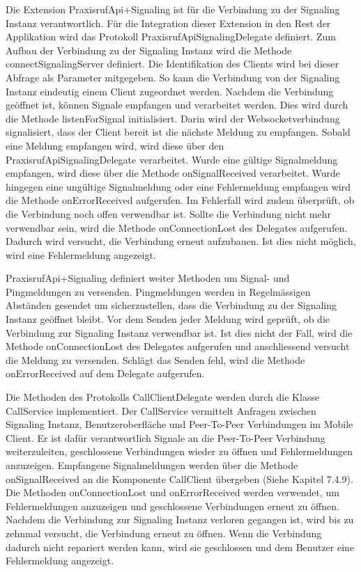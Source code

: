 Die Extension PraxisrufApi+Signaling ist für die Verbindung zu der Signaling Instanz verantwortlich.
Für die Integration dieser Extension in den Rest der Applikation wird das Protokoll PraxisrufApiSignalingDelegate definiert.
Zum Aufbau der Verbindung zu der Signaling Instanz wird die Methode connectSignalingServer definiert.
Die Identifikation des Clients wird bei dieser Abfrage als Parameter mitgegeben.
So kann die Verbindung von der Signaling Instanz eindeutig einem Client zugeordnet werden.
Nachdem die Verbindung geöffnet ist, können Signale empfangen und verarbeitet werden.
Dies wird durch die Methode listenForSignal initialisiert.
Darin wird der Websocketverbindung signalisiert, dass der Client bereit ist die nächste Meldung zu empfangen.
Sobald eine Meldung empfangen wird, wird diese über den PraxisrufApiSignalingDelegate verarbeitet.
Wurde eine gültige Signalmeldung empfangen, wird diese über die Methode onSignalReceived verarbeitet.
Wurde hingegen eine ungültige Signalmeldung oder eine Fehlermeldung empfangen wird die Methode onErrorReceived aufgerufen.
Im Fehlerfall wird zudem überprüft, ob die Verbindung noch offen verwendbar ist.
Sollte die Verbindung nicht mehr verwendbar sein, wird die Methode onConnectionLost des Delegates aufgerufen.
Dadurch wird versucht, die Verbindung erneut aufzubauen.
Ist dies nicht möglich, wird eine Fehlermeldung angezeigt. 

PraxisrufApi+Signaling definiert weiter Methoden um Signal- und Pingmeldungen zu versenden.
Pingmeldungen werden in Regelmässigen Abständen gesendet um sicherzustellen, dass die Verbindung zu der Signaling Instanz geöffnet bleibt.
Vor dem Senden jeder Meldung wird geprüft, ob die Verbindung zur Signaling Instanz verwendbar ist.
Ist dies nicht der Fall, wird die Methode onConnectionLost des Delegates aufgerufen und anschliessend versucht die Meldung zu versenden.
Schlägt das Senden fehl, wird die Methode onErrorReceived auf dem Delegate aufgerufen.

Die Methoden des Protokolls CallClientDelegate werden durch die Klasse CallService implementiert.
Der CallService vermittelt Anfragen zwischen Signaling Instanz, Benutzeroberfläche und Peer-To-Peer Verbindungen im Mobile Client.
Er ist dafür verantwortlich Signale an die Peer-To-Peer Verbindung weiterzuleiten, geschlossene Verbindungen wieder zu öffnen und Fehlermeldungen anzuzeigen.
Empfangene Signalmeldungen werden über die Methode onSignalReceived an die Komponente CallClient übergeben (Siehe Kapitel 7.4.9).
Die Methoden onConnectionLost und onErrorReceived werden verwendet, um Fehlermeldungen anzuzeigen und geschlossene Verbindungen erneut zu öffnen.
Nachdem die Verbindung zur Signaling Instanz verloren gegangen ist, wird bis zu zehnmal versucht, die Verbindung erneut zu öffnen.
Wenn die Verbindung dadurch nicht repariert werden kann, wird sie geschlossen und dem Benutzer eine Fehlermeldung angezeigt.

